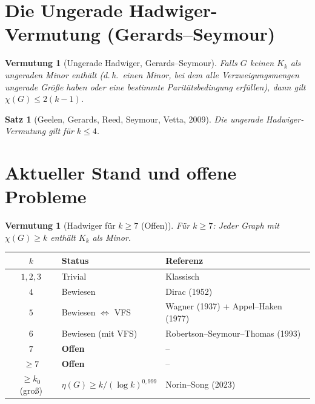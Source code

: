 \documentclass[12pt,a4paper]{amsart}
\newtheorem{satz}[theorem]{Satz}
\newtheorem{vermutung}[theorem]{Vermutung}
\theoremstyle{definition}
\theoremstyle{remark}
\begin{document}
\section{Die Ungerade Hadwiger-Vermutung (Gerards--Seymour)}

\begin{vermutung}[Ungerade Hadwiger, Gerards--Seymour]\label{verm:odd}
Falls $G$ keinen $K_k$ als \emph{ungeraden Minor} enthält (d.\,h.\ einen Minor,
bei dem alle Verzweigungsmengen ungerade Größe haben oder eine bestimmte
Paritätsbedingung erfüllen), dann gilt $\chi(G) \leq 2(k-1)$.
\end{vermutung}

\begin{satz}[Geelen, Gerards, Reed, Seymour, Vetta, 2009]\label{satz:oddHad}
Die ungerade Hadwiger-Vermutung gilt für $k \leq 4$.
\end{satz}

\section{Aktueller Stand und offene Probleme}

\begin{vermutung}[Hadwiger für $k \geq 7$ (Offen)]\label{verm:offen7}
Für $k \geq 7$: Jeder Graph mit $\chi(G) \geq k$ enthält $K_k$ als Minor.
\end{vermutung}

\begin{center}
\begin{tabular}{cll}
\toprule
$k$ & Status & Referenz \\
\midrule
$1, 2, 3$ & Trivial & Klassisch \\
$4$ & Bewiesen & Dirac (1952) \\
$5$ & Bewiesen $\Leftrightarrow$ VFS & Wagner (1937) + Appel--Haken (1977) \\
$6$ & Bewiesen (mit VFS) & Robertson--Seymour--Thomas (1993) \\
$7$ & \textbf{Offen} & -- \\
$\geq 7$ & \textbf{Offen} & -- \\
$\geq k_0$ (groß) & $\eta(G) \geq k/(\log k)^{0{,}999}$ & Norin--Song (2023) \\
\bottomrule
\end{tabular}
\end{center}
\end{document}
